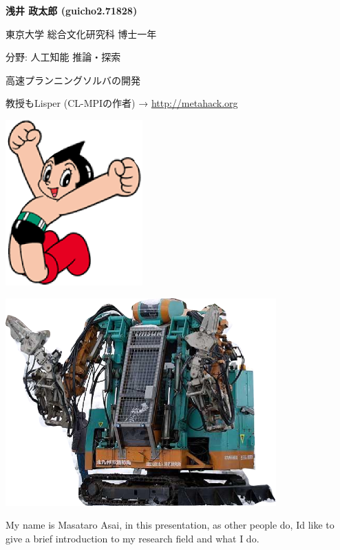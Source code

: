 
\begin{outline-text-1}
\begin{center}
\begin{larger}
\textbf{浅井 政太郎 (guicho2.71828)}
\end{larger}

東京大学 総合文化研究科 博士一年

分野: 人工知能 推論・探索

高速プランニングソルバの開発

教授もLisper (CL-MPIの作者) → \url{http://metahack.org}

\begin{container-fluid}
\begin{row-fluid}
\begin{span6}
\includegraphics{img/astro.png}
\end{span6}
\begin{span6}
\includegraphics{img/rescue.png}
\end{span6}
\end{row-fluid}
\end{container-fluid}
\end{center}

\begin{resume}
My name is Masataro Asai, in this presentation, as other people do, Id like to 
give a brief introduction to my research field and what I do.
\end{resume}
\end{outline-text-1}

